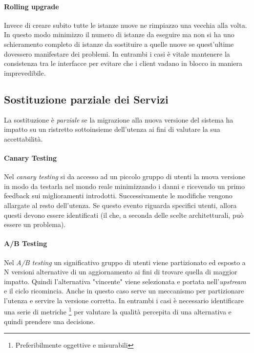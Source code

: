 \documentclass[a4paper,11pt,oneside, table]{article}
\begin{document}
  \paragraph{Rolling upgrade}

  Invece di creare subito tutte le istanze nuove ne rimpiazzo una vecchia alla volta. In questo modo minimizzo il numero di istanze da eseguire ma non si ha uno schieramento completo di istanze da sostituire a quelle nuove se quest'ultime dovessero manifestare dei problemi. In entrambi i casi \`e vitale mantenere la consistenza tra le interfacce per evitare che i client vadano in blocco in maniera imprevedibile.

  \subsection{Sostituzione parziale dei Servizi}

  La sostituzione \`e \textit{parziale} se la migrazione alla nuova versione del sistema ha impatto su un ristretto sottoinsieme dell'utenza ai fini di valutare la sua accettabilit\`a.

  \paragraph{Canary Testing}

  Nel \textit{canary testing} si da accesso ad un piccolo gruppo di utenti la nuova versione in modo da testarla nel mondo reale minimizzando i danni e ricevendo un primo feedback sui miglioramenti introdotti. Successivamente le modifiche vengono allargate al resto dell'utenza. Se questo evento riguarda specifici utenti, allora questi devono essere identificati (il che, a seconda delle scelte architetturali, pu\`o essere un problema).

  \paragraph{A/B Testing}

  Nel \textit{A/B testing} un significativo gruppo di utenti viene partizionato ed esposto a N versioni alternative di un aggiornamento ai fini di trovare quella di maggior impatto. Quindi l'alternativa "vincente" viene selezionata e portata nell'\textit{upstream} e il ciclo ricomincia. Anche in questo caso serve un meccanismo per partizionare l'utenza e servire la versione corretta. In entrambi i casi \`e necessario identificare una serie di metriche \footnote{Preferibilmente oggettive e misurabili} per valutare la qualit\`a percepita di una alternativa e quindi prendere una decisione.

  \printbibliography[title={Bibliografia}]
  \printindex
\end{document}
